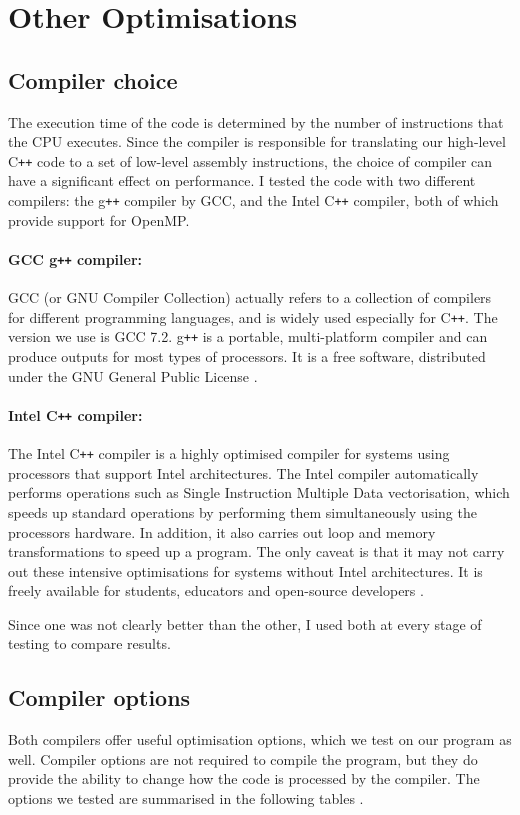 \documentclass[ %
                    author={Manan Vaswani},
                supervisor={Dr. Raphael Clifford},
                    degree={MEng},
                     title={A multi-core CPU implementation of the classical Boson Sampling algorithm},
                  subtitle={},
                      type={},
                      year={2019} ]{dissertation}
\theoremstyle{plain}
\theoremstyle{definition}
\begin{document}
\section{Other Optimisations}
\subsection{Compiler choice}
The execution time of the code is determined by the number of instructions that the CPU executes. Since the compiler is responsible for translating our high-level C\texttt{++} code to a set of low-level assembly instructions, the choice of compiler can have a significant effect on performance. I tested the code with two different compilers: the g\texttt{++} compiler by GCC, and the Intel C\texttt{++} compiler, both of which provide support for OpenMP.
\paragraph{GCC g\texttt{++} compiler: } GCC (or GNU Compiler Collection) actually refers to a collection of compilers for different programming languages, and is widely used especially for C\texttt{++}. The version we use is GCC 7.2. g\texttt{++} is a portable, multi-platform compiler and can produce outputs for most types of processors. It is a free software, distributed under the GNU General Public License \cite{gcc_compiler}.

\paragraph{Intel C\texttt{++} compiler: } The Intel C\texttt{++} compiler is a highly optimised compiler for systems using processors that support Intel architectures. The Intel compiler automatically performs operations such as Single Instruction Multiple Data vectorisation, which speeds up standard operations by performing them simultaneously using the processors hardware. In addition, it also carries out loop and memory transformations to speed up a program. The only caveat is that it may not carry out these intensive optimisations for systems without Intel architectures. It is freely available for students, educators and open-source developers \cite{intel_compiler}.

Since one was not clearly better than the other, I used both at every stage of testing to compare results.

\subsection{Compiler options} \label{sec:flags}
Both compilers offer useful optimisation options, which we test on our program as well. Compiler options are not required to compile the program, but they do provide the ability to change how the code is processed by the compiler. The options we tested are summarised in the following tables \cite{gcc_flags}.
\end{document}
